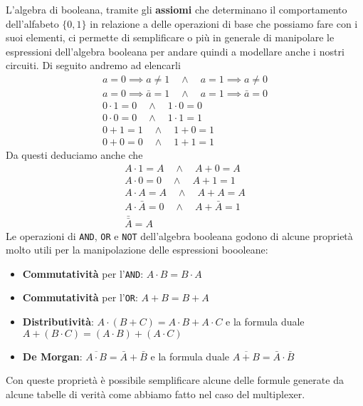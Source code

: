 L'algebra di booleana, tramite gli \textbf{assiomi} che determinano il comportamento dell'alfabeto
$\{0, 1\}$ in relazione a delle operazioni di base che possiamo fare con i suoi elementi, ci
permette di semplificare o più in generale di manipolare le espressioni dell'algebra booleana per
andare quindi a modellare anche i nostri circuiti. Di seguito andremo ad elencarli
\begin{gather*}
	a = 0 \implies a \neq 1 \quad \land \quad a = 1 \implies a \neq 0 \\
	a = 0 \implies \bar{a} = 1 \quad \land \quad a = 1 \implies \bar{a} = 0 \\
	0 \cdot 1 = 0 \quad \land \quad 1 \cdot 0 = 0 \\
	0 \cdot 0 = 0 \quad \land \quad 1 \cdot 1 = 1 \\
	0 + 1 = 1 \quad \land \quad 1 + 0 = 1 \\
	0 + 0 = 0 \quad \land \quad 1 + 1 = 1
\end{gather*}
Da questi deduciamo anche che
\begin{gather*}
	A \cdot 1 = A \quad \land \quad A + 0 = A \\
	A \cdot 0 = 0 \quad \land \quad A + 1 = 1 \\
	A \cdot A = A \quad \land \quad A + A = A \\
	A \cdot \bar{A} = 0 \quad \land \quad A + \bar{A} = 1 \\
	\bar{\bar{A}} = A
\end{gather*}
Le operazioni di \verb|AND|, \verb|OR| e \verb|NOT| dell'algebra booleana godono di alcune
proprietà molto utili per la manipolazione delle espressioni boooleane:
\begin{itemize}
	\item \textbf{Commutatività} per l'\verb|AND|: $A \cdot B = B \cdot A$
	\item \textbf{Commutatività} per l'\verb|OR|: $A + B = B + A$
	\item \textbf{Distributività}: $A \cdot (B + C) = A \cdot B + A \cdot C$ e la formula duale
	      $A + (B \cdot C) = (A \cdot B) + (A \cdot C)$
	\item \textbf{De Morgan}: $\overline{A \cdot B} = \bar{A} + \bar{B}$ e la formula duale
	      $\overline{A + B} = \bar{A} \cdot \bar{B}$
\end{itemize}
Con queste proprietà è possibile semplificare alcune delle formule generate da alcune tabelle di
verità come abbiamo fatto nel caso del multiplexer.